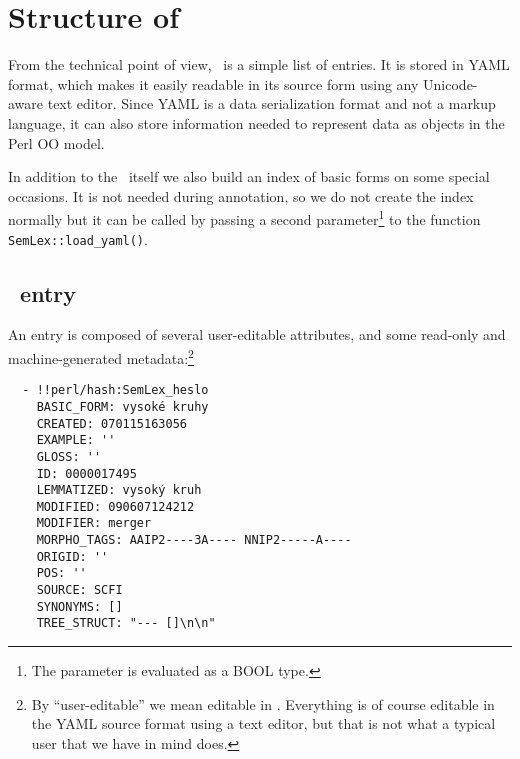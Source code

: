 \section{Structure of \semlex}

From the technical point of view, \semlex\ is a simple list of entries. It is stored in YAML format, which makes it easily readable in its source form using any Unicode-aware text editor. Since YAML is a data serialization format and not a markup language, it can also store information needed to represent data as objects in the Perl OO model. 

In addition to the \semlex\ itself we also build an index of basic forms on some special occasions. It is not needed during annotation, so we do not create the index normally but it can be called by passing a second parameter\footnote{The parameter is evaluated as a BOOL type.} to the function \verb=SemLex::load_yaml()=. 

\subsection{\semlex\ entry}
An entry is composed of several user-editable attributes, and some read-only and machine-generated metadata:\footnote{By ``user-editable'' we mean editable in \seman. Everything is of course editable in the YAML source format using a text editor, but that is not what a typical user that we have in mind does.} 
\begin{verbatim}
  - !!perl/hash:SemLex_heslo 
    BASIC_FORM: vysoké kruhy
    CREATED: 070115163056
    EXAMPLE: ''
    GLOSS: ''
    ID: 0000017495
    LEMMATIZED: vysoký kruh
    MODIFIED: 090607124212
    MODIFIER: merger
    MORPHO_TAGS: AAIP2----3A---- NNIP2-----A----
    ORIGID: ''
    POS: ''
    SOURCE: SCFI
    SYNONYMS: []
    TREE_STRUCT: "--- []\n\n"
\end{verbatim}

